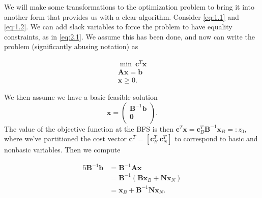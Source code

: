 \documentclass[12pt,english]{article}
\begin{document}
We will make some transformations to the optimization problem to bring it into another form that provides us with a clear algorithm.  Consider \eqref{eq:1.1} and \eqref{eq:1.2}.  We can add slack variables to force the problem to have equality constraints, as in \eqref{eq:2.1}.  We assume this has been done, and now can write the problem (significantly abusing notation) as 

\begin{equation}\label{eq:4.1}
\begin{array}{l}
\min~\mathbf{c}^T \mathbf{x} \\
\mathbf{A} \mathbf{x} = \mathbf{b} \\
\mathbf{x} \geq 0.
\end{array}
\end{equation}

We then assume we have a basic feasible solution 
$$
\mathbf{x} = 
\left(
\begin{array}{c}
\mathbf{B}^{-1}\mathbf{b}  \\
\mathbf{0} \\
\end{array}
\right).
$$
The value of the objective function at the BFS is then $\mathbf{c}^T \mathbf{x} = \mathbf{c}_B^T \mathbf{B}^{-1}\mathbf{x}_B =:z_0$, where we've partitioned the cost vector $\mathbf{c}^T = [ \mathbf{c}_B^T ~\mathbf{c}_N^T]$ to correspond to basic and nonbasic variables.  Then we compute


\begin{alignat*}{5}
\mathbf{B}^{-1} \mathbf{b}  	&= \mathbf{B}^{-1}\mathbf{A}\mathbf{x} \\
						&= \mathbf{B}^{-1}(\mathbf{B}\mathbf{x}_B + \mathbf{N}\mathbf{x}_N) \\
						&= \mathbf{x}_B + \mathbf{B}^{-1} \mathbf{N} \mathbf{x}_N.
\end{alignat*}
\end{document}
